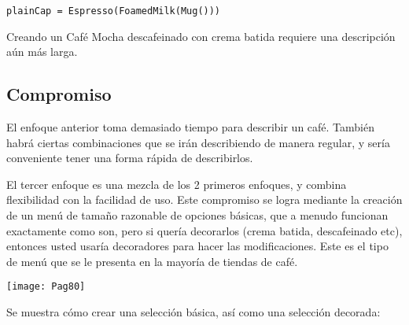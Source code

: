 \begin{lstlisting} 
plainCap = Espresso(FoamedMilk(Mug()))
\end{lstlisting}

Creando un Café Mocha descafeinado con crema batida requiere una descripción aún más larga. \newline


\subsection*{Compromiso}
\label{subsec:c}

El enfoque anterior toma demasiado tiempo para describir un café. También habrá ciertas combinaciones que se irán describiendo de manera regular, y sería conveniente tener una forma rápida de describirlos.     \newline

El tercer enfoque es una mezcla de los 2 primeros enfoques, y combina flexibilidad con la facilidad de uso. Este compromiso se logra mediante la creación de un menú de tamaño razonable de opciones básicas, que a menudo funcionan exactamente como son, pero si quería decorarlos (crema batida, descafeinado etc), entonces usted usaría decoradores para hacer las modificaciones. Este es el tipo de menú que se le presenta en la mayoría de tiendas de café.    \newline

\texttt{[image: Pag80]}

Se muestra cómo crear una selección básica, así como una selección decorada:     \newline

